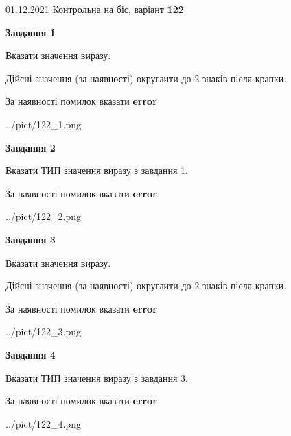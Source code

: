 \documentclass[11pt, ukrainian]{article}
\begin{document}
{01.12.2021 Контрольна на біс, варіант  \No \textbf { 122 }\par}
{
\begin {large}
{\begin {center}\textbf{Завдання 1}\end {center}}\par
Вказати значення виразу. \par
Дійсні значення (за наявності) округлити до 2 знаків після крапки. \par
За наявності помилок вказати \textbf{error}

\begin{center}
	{../pict/122_1.png}
\end{center}
\newpage

{\begin {center}\textbf{Завдання 2}\end {center}}\par
Вказати ТИП значення виразу з завдання 1. \par
За наявності помилок вказати \textbf{error}

\begin{center}
	{../pict/122_2.png}
\end{center}
\newpage

{\begin {center}\textbf{Завдання 3}\end {center}}\par
Вказати значення виразу. \par
Дійсні значення (за наявності) округлити до 2 знаків після крапки. \par
За наявності помилок вказати \textbf{error}

\begin{center}
	{../pict/122_3.png}
\end{center}
\newpage

{\begin {center}\textbf{Завдання 4}\end {center}}\par
Вказати ТИП значення виразу з завдання 3. \par
За наявності помилок вказати \textbf{error}

\begin{center}
	{../pict/122_4.png}
\end{center}
\newpage


\end{large}}
\end{document}

